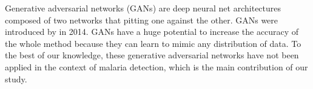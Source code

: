 Generative adversarial networks (GANs) are deep neural net architectures composed of two networks that pitting one against the other. GANs were introduced by \cite{goodfellow2014generative} in 2014.
GANs have a huge potential to increase the accuracy of the whole method because they can learn to mimic any distribution of data. To the best of our knowledge, these generative adversarial networks have not been applied in the context of malaria detection, which is the main contribution of our study.







